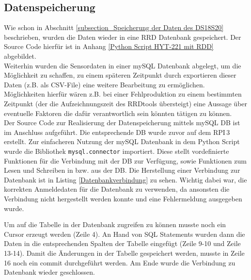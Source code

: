 \subsection{Datenspeicherung}
\label{subsection_Datenspeicherung_HYT221}
Wie schon in Abschnitt \ref{subsection_Speicherung der Daten des DS18S20} beschrieben, wurden die Daten wieder in eine RRD Datenbank gespeichert. Der Source Code hierfür ist in Anhang \ref{Python Script HYT-221 mit RDD} abgebildet.\\
Weiterhin wurden die Sensordaten in einer mySQL Datenbank abgelegt, um die Möglichkeit zu schaffen, zu einem späteren Zeitpunkt durch exportieren dieser Daten (z.B. als CSV-File) eine weitere Bearbeitung zu ermöglichen. Möglichkeiten hierfür wären z.B. bei einer Fehlproduktion zu einem bestimmten Zeitpunkt (der die Aufzeichnungszeit des RRDtools übersteigt) eine Aussage über eventuelle Faktoren die dafür verantwortlich sein könnten tätigen zu können.\\
Der Source Code zur Realisierung der Datenspeicherung mittels mySQL DB ist im Anschluss aufgeführt. Die entsprechende DB wurde zuvor auf dem \ac{RPI}\,3 erstellt. Zur einfacheren Nutzung der mySQL Datenbank in dem Python Script wurde die Bibliothek \texttt{mysql.connector} importiert. Diese stellt vordefinierte Funktionen für die Verbindung mit der DB zur Verfügung, sowie Funktionen zum Lesen und Schreiben in bzw. aus der DB. Die Herstellung einer Verbindung zur Datenbank ist in Listing \ref{Datenbankverbindung} zu sehen.
Wichtig dabei war, die korrekten Anmeldedaten für die Datenbank zu verwenden, da ansonsten die Verbindung nicht hergestellt werden konnte und eine Fehlermeldung ausgegeben wurde.



Um auf die Tabelle in der Datenbank zugreifen zu können musste noch ein Cursor erzeugt werden (Zeile 4). An Hand von SQL Statements wurden dann die Daten in die entsprechenden Spalten der Tabelle eingefügt (Zeile 9-10 und Zeile 13-14). Damit die Änderungen in der Tabelle gespeichert werden, musste in Zeile 16 noch ein commit durchgeführt werden. Am Ende wurde die Verbindung zu Datenbank wieder geschlossen.



